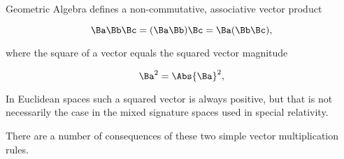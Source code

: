 %
%

Geometric Algebra defines a non-commutative, associative vector product

\begin{equation}\label{eqn:emtProblemSet1Appendix:20}
\Ba \Bb \Bc
=
(\Ba \Bb) \Bc
=
\Ba (\Bb \Bc),
\end{equation}

where the square of a vector equals the squared vector magnitude

\begin{dmath}\label{eqn:emtProblemSet1Appendix:40}
\Ba^2 = \Abs{\Ba}^2,
\end{dmath}

In Euclidean spaces such a squared vector is always positive, but that is not necessarily the case in the mixed signature spaces used in special relativity.

There are a number of consequences of these two simple vector multiplication rules.

